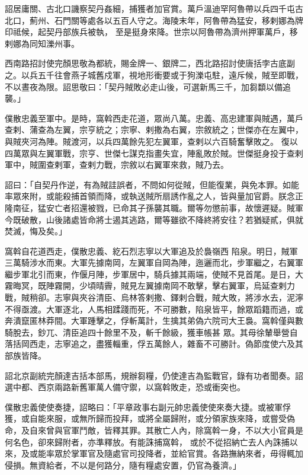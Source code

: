 \begin{pinyinscope}
 詔居庸關、古北口譏察契丹姦細，捕獲者加官賞。萬戶溫迪罕阿魯帶以兵四千屯古北口，薊州、石門關等處各以五百人守之。海陵末年，阿魯帶為猛安，移剌娜為牌印祗候，起契丹部族兵被執，
 至是挺身來降。世宗以阿魯帶為濟州押軍萬戶，移剌娜為同知濼州事。



 西南路招討使完顏思敬為都統，賜金牌一、銀牌二，西北路招討使唐括孛古底副之。以兵五千往會燕子城舊戍軍，視地形衝要或于狗濼屯駐，遠斥候，賊至即戰，不以晝夜為限。詔思敬曰：「契丹賊敗必走山後，可選新馬三千，加芻纇以備追襲。」



 僕散忠義至軍中。是時，窩斡西走花道，眾尚八萬。忠義、高忠建軍與賊遇，萬戶查剌、蒲查為左翼，宗亨統之；宗寧、剌撒為右翼，宗敘統之；世傑亦在左翼中，與賊夾河為陣。賊渡河，以兵四萬餘先犯左翼軍，查剌以六百騎奮擊敗之。
 復以四萬眾與左翼軍戰，宗亨、世傑七謀克指畫失宜，陣亂敗於賊。世傑挺身投于查剌軍中，賊圍查剌軍，查剌力戰，宗敘以右翼軍來救，賊乃去。



 詔曰：「自契丹作逆，有為賊詿誤者，不問如何從賊，但能復業，與免本罪。如能率眾來附，或能殺捕首領而降，或執送賊所扇誘作亂之人，皆與量加官爵。朕念正隆南征，猛安亡者招還被戮，已命其子孫襲其職。爾等勿懲前事，故懷遲疑。賊軍今既破散，山後諸處皆命將士遏其逃路，爾等雖欲不降終將安往？若猶疑貳，俱就焚滅，悔及矣。」



 窩斡自花道西走，僕散忠義、紇石烈志寧以大軍追及於裊嶺西
 陷泉。明日，賊軍三萬騎涉水而東。大軍先據南岡，左翼軍自岡為陣，迤邐而北，步軍繼之，右翼軍繼步軍北引而東，作偃月陣，步軍居中，騎兵據其兩端，使賊不見首尾。是日，大霧晦冥，既陣霧開，少頃晴霽，賊見左翼據南岡不敢擊，擊右翼軍，烏延查剌力戰，賊稍卻。志寧與夾谷清臣、烏林答剌撒、鐸剌合戰，賊大敗，將涉水去，泥濘不得亟渡。大軍逐北，人馬相蹂踐而死，不可勝數，陷泉皆平，餘眾蹈籍而過，或奔潰竄匿林莽間。大軍踵擊之，俘斬萬計，生擒其弟偽六院司大王裊。窩斡僅與數騎脫去，鈔兀、清臣追四十餘里不及，斬千餘級，獲車帳甚
 眾。其母徐輦舉營自落括岡西走，志寧追之，盡獲輜重，俘五萬餘人，雜畜不可勝計。偽節度使六及其部族皆降。



 詔北京副統完顏達吉括本部馬，規辦芻糧，仍使達吉為監戰官，錄有功者聞奏。詔選中都、西京兩路新舊軍萬人備守禦，以窩斡敗走，恐或衝突也。



 僕散忠義使使奏捷，詔略曰：「平章政事右副元帥忠義使使來奏大捷。或被軍俘獲，或自能來服，或無所歸而投拜，或將全屬歸附，或分領家族來降，或嘗受偽命，及自來曾與官軍鬥敵，皆釋其罪。其散亡人內，除窩斡一身，不以大小官員是何名色，卻來歸附者，亦準釋放。有能誅捕窩斡，
 或於不從招納亡去人內誅捕以來，及或能率眾於掌軍官及隨處官司投降者，並給官賞。各路撫納來者，毋得輒加侵損。無資給者，不以是何路分，隨有糧處安置，仍官為養濟。」




\end{pinyinscope}

